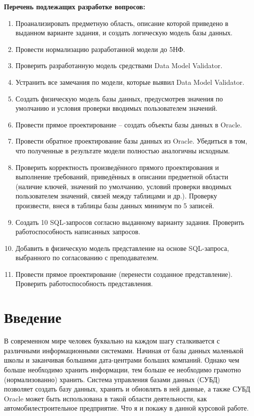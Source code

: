 {\bf Перечень подлежащих разработке вопросов:}
\begin{enumerate}
    \item Проанализировать предметную область, описание которой приведено в выданном варианте задания, и создать логическую модель базы данных.
    \item Провести нормализацию разработанной модели до 5НФ.
    \item Проверить разработанную модель средствами Data Model Validator.
    \item Устранить все замечания по модели, которые выявил Data Model Validator.
    \item Создать физическую модель базы данных, предусмотрев значения по умолчанию и условия проверки вводимых пользователем значений.
    \item Провести прямое проектирование – создать объекты базы данных в Oracle.
    \item Провести обратное проектирование базы данных из Oracle. Убедиться в том, что полученные в результате модели полностью аналогичны исходным.
    \item Проверить корректность произведённого прямого проектирования и выполнение требований, приведённых в описании предметной области (наличие ключей, значений по умолчанию, условий проверки вводимых пользователем значений, связей между таблицами и др.). Проверку произвести, внеся в таблицы базы данных минимум по 5 записей.
    \item Создать 10 SQL-запросов согласно выданному варианту задания. Проверить работоспособность написанных запросов.
    \item Добавить в физическую модель представление на основе SQL-запроса, выбранного по согласованию с преподавателем.
    \item Провести прямое проектирование (перенести созданное представление). Проверить работоспособность представления.
\end{enumerate}

\newpage
\tableofcontents
\newpage

\section{Введение}
В современном мире человек буквально на каждом шагу сталкивается с различными информационными системами.
Начиная от базы данных маленькой школы и заканчивая большими дата-центрами больших компаний.
Однако чем больше необходимо хранить информации, тем больше ее необходимо грамотно (нормализованно) хранить.
Система управления базами данных (СУБД) позволяет создать базу данных, хранить и обновлять в ней данные, а также
СУБД Oracle может быть использована в такой области деятельности, как автомобилестроительное предприятие.
Что я и покажу в данной курсовой работе.

